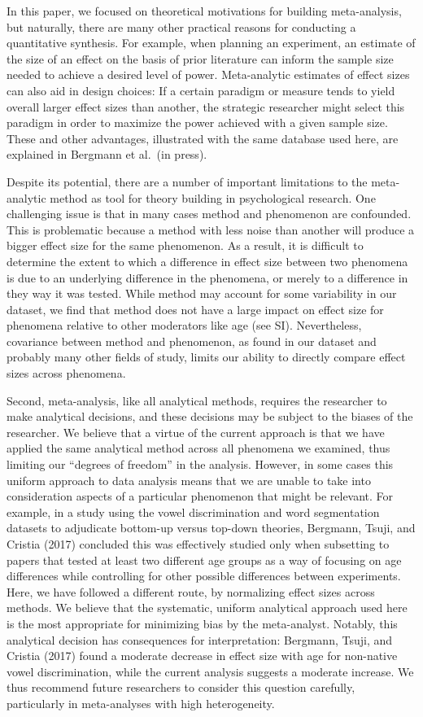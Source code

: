 \documentclass[english,floatsintext,man]{apa6}
\theoremstyle{definition}
\theoremstyle{definition}
\theoremstyle{remark}
\begin{document}
In this paper, we focused on theoretical motivations for building
meta-analysis, but naturally, there are many other practical reasons for
conducting a quantitative synthesis. For example, when planning an
experiment, an estimate of the size of an effect on the basis of prior
literature can inform the sample size needed to achieve a desired level
of power. Meta-analytic estimates of effect sizes can also aid in design
choices: If a certain paradigm or measure tends to yield overall larger
effect sizes than another, the strategic researcher might select this
paradigm in order to maximize the power achieved with a given sample
size. These and other advantages, illustrated with the same database
used here, are explained in Bergmann et al.~(in press).

Despite its potential, there are a number of important limitations to
the meta-analytic method as tool for theory building in psychological
research. One challenging issue is that in many cases method and
phenomenon are confounded. This is problematic because a method with
less noise than another will produce a bigger effect size for the same
phenomenon. As a result, it is difficult to determine the extent to
which a difference in effect size between two phenomena is due to an
underlying difference in the phenomena, or merely to a difference in
they way it was tested. While method may account for some variability in
our dataset, we find that method does not have a large impact on effect
size for phenomena relative to other moderators like age (see SI).
Nevertheless, covariance between method and phenomenon, as found in our
dataset and probably many other fields of study, limits our ability to
directly compare effect sizes across phenomena.

Second, meta-analysis, like all analytical methods, requires the
researcher to make analytical decisions, and these decisions may be
subject to the biases of the researcher. We believe that a virtue of the
current approach is that we have applied the same analytical method
across all phenomena we examined, thus limiting our \enquote{degrees of
freedom} in the analysis. However, in some cases this uniform approach
to data analysis means that we are unable to take into consideration
aspects of a particular phenomenon that might be relevant. For example,
in a study using the vowel discrimination and word segmentation datasets
to adjudicate bottom-up versus top-down theories, Bergmann, Tsuji, and
Cristia (2017) concluded this was effectively studied only when
subsetting to papers that tested at least two different age groups as a
way of focusing on age differences while controlling for other possible
differences between experiments. Here, we have followed a different
route, by normalizing effect sizes across methods. We believe that the
systematic, uniform analytical approach used here is the most
appropriate for minimizing bias by the meta-analyst. Notably, this
analytical decision has consequences for interpretation: Bergmann,
Tsuji, and Cristia (2017) found a moderate decrease in effect size with
age for non-native vowel discrimination, while the current analysis
suggests a moderate increase. We thus recommend future researchers to
consider this question carefully, particularly in meta-analyses with
high heterogeneity.
\end{document}
